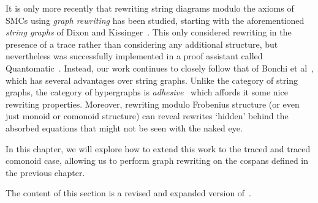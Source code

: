 It is only more recently that rewriting string diagrams modulo the axioms of
SMCs using \emph{graph rewriting} has been studied, starting with the
aforementioned \emph{string graphs} of Dixon and
Kissinger~\cite{dixon2010open,kissinger2012pictures,dixon2013opengraphs}.
This only considered rewriting in the presence of a trace rather than
considering any additional structure, but nevertheless was successfully
implemented in a proof assistant called
Quantomatic~\cite{kissinger2015quantomatic}.
Instead, our work continues to closely follow that of Bonchi et
al~\cite{bonchi2022string,bonchi2022stringa}, which has several advantages
over string graphs.
Unlike the category of string graphs, the category of hypergraphs is
\emph{adhesive}~\cite{lack2004adhesive} which affords it some nice rewriting
properties.
Moreover, rewriting modulo Frobenius structure (or even just monoid or comonoid
structure) can reveal rewrites `hidden' behind the absorbed equations that might
not be seen with the naked eye.

In this chapter, we will explore how to extend this work to the traced and
traced comonoid case, allowing us to perform graph rewriting on the cospans
defined in the previous chapter.

\begin{remark}
    The content of this section is a revised and expanded version
    of~\cite[Sec. 5]{ghica2023rewriting}.
\end{remark}




